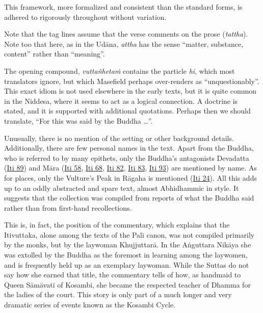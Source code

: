 \documentclass[12pt,openany]{book}%
\begin{document}
This framework, more formalized and consistent than the standard forms, is adhered to rigorously throughout without variation.

Note that the tag lines assume that the verse comments on the prose (\emph{tattha}). Note too that here, as in the \textsanskrit{Udāna}, \emph{attha} has the sense “matter, substance, content” rather than “meaning”.

The opening compound, \emph{\textsanskrit{vuttañhetaṁ}} contains the particle \emph{hi}, which most translators ignore, but which Masefield perhaps over-renders as “unquestionably”. This exact idiom is not used elsewhere in the early texts, but it is quite common in the Niddesa, where it seems to act as a logical connection. A doctrine is stated, and it is supported with additional quotations. Perhaps then we should translate, “For this was said by the Buddha …”.

Unusually, there is no mention of the setting or other background details. Additionally, there are few personal names in the text. Apart from the Buddha, who is referred to by many epithets, only the Buddha’s antagonists Devadatta (\href{https://suttacentral.net/iti89/en/sujato}{Iti 89}) and \textsanskrit{Māra} (\href{https://suttacentral.net/iti58/en/sujato}{Iti 58}, \href{https://suttacentral.net/iti68/en/sujato}{Iti 68}, \href{https://suttacentral.net/iti82/en/sujato}{Iti 82}, \href{https://suttacentral.net/iti83/en/sujato}{Iti 83}, \href{https://suttacentral.net/iti93/en/sujato}{Iti 93}) are mentioned by name. As for places, only the Vulture’s Peak in \textsanskrit{Rāgaha} is mentioned (\href{https://suttacentral.net/iti24/en/sujato}{Iti 24}). All this adds up to an oddly abstracted and spare text, almost Abhidhammic in style. It suggests that the collection was compiled from reports of what the Buddha said rather than from first-hand recollections.

This is, in fact, the position of the commentary, which explains that the Itivuttaka, alone among the texts of the Pali canon, was not compiled primarily by the monks, but by the laywoman \textsanskrit{Khujjuttarā}. In the \textsanskrit{Aṅguttara} \textsanskrit{Nikāya} she was extolled by the Buddha as the foremost in learning among the laywomen, and is frequently held up as an exemplary laywoman. While the Suttas do not say how she earned that title, the commentary tells of how, as handmaid to Queen \textsanskrit{Sāmāvatī} of Kosambi, she became the respected teacher of Dhamma for the ladies of the court. This story is only part of a much longer and very dramatic series of events known as the Kosambi Cycle.
\end{document}
